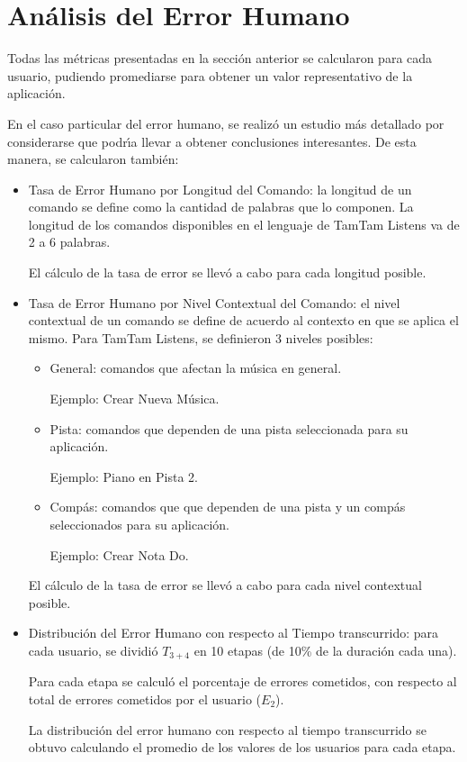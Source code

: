 \section{An\'alisis del Error Humano}
\label{sec:evaluacionError}
Todas las m\'etricas presentadas en la secci\'on anterior se calcularon para cada usuario,
pudiendo promediarse para obtener un valor representativo de la aplicaci\'on.

En el caso particular del error humano, se realiz\'o un estudio m\'as detallado
por considerarse que podr{\'\i}a llevar a obtener conclusiones interesantes. De esta manera,
se calcularon tambi\'en:

\begin{itemize}
	\item Tasa de Error Humano por Longitud del Comando: la longitud de un comando se define
	como la cantidad de palabras que lo componen. La longitud de los comandos disponibles en el 
	lenguaje de TamTam Listens va de 2 a 6 palabras.

	El c\'alculo de la tasa de error se llev\'o a cabo para cada longitud posible.  


	\item Tasa de Error Humano por Nivel Contextual del Comando: el nivel contextual de un comando
	se define de acuerdo al contexto en que se aplica el mismo.
	Para TamTam Listens, se definieron 3 niveles posibles:
		\begin{itemize}
			\item General: comandos que afectan la m\'usica en general. 

			Ejemplo: Crear Nueva M\'usica.
			\item Pista: comandos que dependen de una pista seleccionada para su aplicaci\'on. 

			Ejemplo: Piano en Pista 2.
			\item Comp\'as: comandos que que dependen de una pista y un comp\'as seleccionados 
			para su aplicaci\'on. 

			Ejemplo: Crear Nota Do.
		\end{itemize}
	
		
	El c\'alculo de la tasa de error se llev\'o a cabo para cada nivel contextual posible.
	\item Distribuci\'on del Error Humano con respecto al Tiempo transcurrido: para cada usuario, 
	se dividi\'o $T_{3+4}$ en 10 etapas (de 10\% de la duraci\'on cada una).

	Para cada etapa se calcul\'o el porcentaje de errores cometidos, con respecto al total de
	errores cometidos por el usuario ($E_2$).

	La distribuci\'on del error humano con respecto al tiempo transcurrido se obtuvo calculando 
	el promedio de los valores de los usuarios para cada etapa.  
\end{itemize}